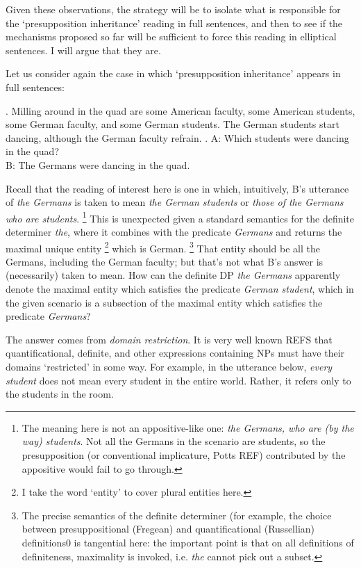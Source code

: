 \documentclass[doublespace]{umthesis}
\begin{document}
Given these observations, the strategy will be to isolate what is responsible for the `presupposition inheritance' reading in full sentences, and then to see if the mechanisms proposed so far will be sufficient to force this reading in elliptical sentences.
I will argue that they are.

Let us consider again the case in which `presupposition inheritance' appears in full sentences:

\ex. 	Milling around in the quad are some American faculty, some American students, some German faculty, and some German students.\label{ex-domain-restriction-in-full-answers}
The German students start dancing, although the German faculty refrain.
	\a. A: Which students were dancing in the quad?\\
	B: The Germans were dancing in the quad.
	
Recall that the reading of interest here is one in which, intuitively, B's utterance of {\it the Germans} is taken to mean {\it the German students} or {\it those of the Germans who are students}.
\footnote{The meaning here is not an appositive-like one: {\it the Germans, who are (by the way) students}.
Not all the Germans in the scenario are students, so the presupposition (or conventional implicature, Potts REF)%
contributed by the appositive would fail to go through.}
This is unexpected given a standard semantics for the definite determiner {\it the}, where it combines with the predicate {\it Germans} and returns the maximal unique entity
\footnote{I take the word `entity' to cover plural entities here.}
which is German.
\footnote{The precise semantics of the definite determiner (for example, the choice between presuppositional (Fregean) and quantificational (Russellian) definitions0 is tangential here: the important point is that on all definitions of definiteness, maximality is invoked, i.e. {\it the} cannot pick out a subset.}
That entity should be all the Germans, including the German faculty; but that's not what B's answer is (necessarily) taken to mean.
How can the definite DP {\it the Germans} apparently denote the maximal entity which satisfies the predicate {\it German student}, which in the given scenario is a subsection of the maximal entity which satisfies the predicate {\it Germans}?

The answer comes from {\it domain restriction}.
It is very well known REFS %
that quantificational, definite, and other expressions containing NPs must have their domains `restricted' in some way.
For example, in the utterance below, {\it every student} does not mean every student in the entire world.
Rather, it refers only to the students in the room.
\end{document}
